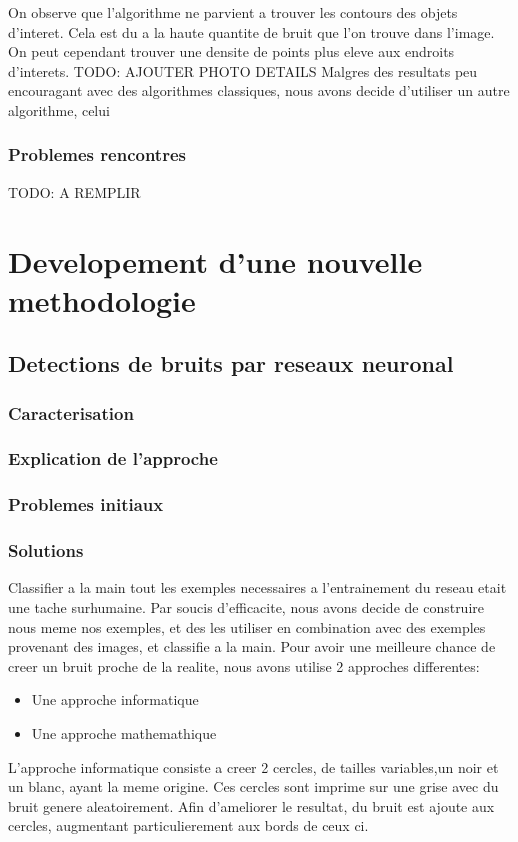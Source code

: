 \documentclass[a4paper, 12pt, titlepage, oneside]{article}
\begin{document}
	On observe que l'algorithme ne parvient a trouver les contours des objets d'interet. Cela est du a la haute quantite de bruit que l'on trouve dans l'image. On 
	peut cependant trouver une densite de points plus eleve aux endroits d'interets.
	TODO: AJOUTER PHOTO DETAILS 
	Malgres des resultats peu encouragant avec des algorithmes classiques, nous avons decide d'utiliser un autre algorithme, celui
	
	\subsubsection{Problemes rencontres}
	TODO: A REMPLIR
	
\newpage
\section{Developement d'une nouvelle methodologie}
	\subsection{Detections de bruits par reseaux neuronal}
	\subsubsection{Caracterisation}
	\subsubsection{Explication de l'approche}
	\subsubsection{Problemes initiaux}
	\subsubsection{Solutions}
	Classifier a la main tout les exemples necessaires a l'entrainement du reseau etait une tache surhumaine. Par soucis d'efficacite, nous avons decide de construire nous meme
	nos exemples, et des les utiliser en combination avec des exemples provenant des images, et classifie a la main.
	Pour avoir une meilleure chance de creer un bruit proche de la realite, nous avons utilise 2 approches differentes:
	\begin{itemize}
		\item Une approche informatique
		\item Une approche mathemathique
	\end{itemize}
	L'approche informatique consiste a creer 2 cercles, de tailles variables,un noir et un blanc, ayant la meme origine. Ces cercles sont imprime sur une  grise
	avec du bruit genere aleatoirement. Afin d'ameliorer le resultat, du bruit est ajoute aux cercles, augmentant particulierement aux bords de ceux ci.
		
\end{document}
